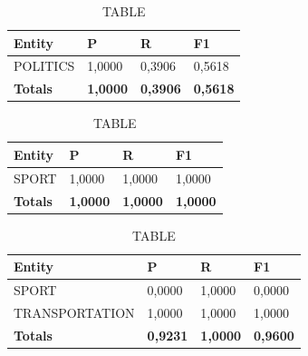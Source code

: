 \documentclass[thesis=M,english]{FITthesis}[2018/05/30]
\begin{document}
	\begin{table}[H]\centering
		\caption{TABLE}
		\label{}
		\begin{tabular}{|l|l|l|l|}
			\hline {\textbf{Entity}} & {\textbf{P}} & {\textbf{R}} & {\textbf{F1}}\\\hline
				POLITICS & 1,0000 & 0,3906 & 0,5618\\\hline
				\textbf{Totals} & \textbf{1,0000} & \textbf{0,3906} & \textbf{0,5618}\\\hline
		\end{tabular}
	\end{table}

	\begin{table}[H]\centering
		\caption{TABLE}
		\label{}
		\begin{tabular}{|l|l|l|l|}
			\hline {\textbf{Entity}} & {\textbf{P}} & {\textbf{R}} & {\textbf{F1}}\\\hline
				SPORT & 1,0000 & 1,0000 & 1,0000\\\hline
				\textbf{Totals} & \textbf{1,0000} & \textbf{1,0000} & \textbf{1,0000}\\\hline
		\end{tabular}
	\end{table}	

	\begin{table}[H]\centering
		\caption{TABLE}
		\label{}
		\begin{tabular}{|l|l|l|l|}
			\hline {\textbf{Entity}} & {\textbf{P}} & {\textbf{R}} & {\textbf{F1}}\\\hline
				SPORT & 0,0000 & 1,0000 & 0,0000\\
				TRANSPORTATION & 1,0000 & 1,0000 & 1,0000\\\hline
				\textbf{Totals} & \textbf{0,9231} & \textbf{1,0000} & \textbf{0,9600}\\\hline
		\end{tabular}
	\end{table}	
	
\end{document}
